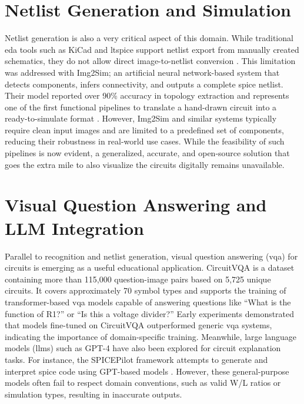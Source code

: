 \section{Netlist Generation and Simulation}

Netlist generation is also a very critical aspect of this domain. While traditional \gls{eda} tools such as KiCad and \gls{ltspice} support netlist export from manually created schematics, they do not allow direct image-to-netlist conversion \cite{kicad2024spice}. This limitation was addressed with Img2Sim; an artificial neural network-based system that detects components, infers connectivity, and outputs a complete \gls{spice} netlist. Their model reported over 90\% accuracy in topology extraction and represents one of the first functional pipelines to translate a hand-drawn circuit into a ready-to-simulate format \cite{sertdemir2022img2sim}. However, Img2Sim and similar systems typically require clean input images and are limited to a predefined set of components, reducing their robustness in real-world use cases. While the feasibility of such pipelines is now evident, a generalized, accurate, and open-source solution that goes the extra mile to also visualize the circuits digitally remains unavailable.

\section{Visual Question Answering and LLM Integration}

Parallel to recognition and netlist generation, visual question answering (\gls{vqa}) for circuits is emerging as a useful educational application. CircuitVQA is a dataset containing more than 115,000 question-image pairs based on 5,725 unique circuits. It covers approximately 70 symbol types and supports the training of transformer-based \gls{vqa} models capable of answering questions like ``What is the function of R1?'' or ``Is this a voltage divider?'' Early experiments demonstrated that models fine-tuned on CircuitVQA outperformed generic \gls{vqa} systems, indicating the importance of domain-specific training. Meanwhile, large language models (\glspl{llm}) such as GPT-4 have also been explored for circuit explanation tasks. For instance, the SPICEPilot framework attempts to generate and interpret \gls{spice} code using GPT-based models \cite{vungarala2024spicepilot}. However, these general-purpose models often fail to respect domain conventions, such as valid W/L ratios or simulation types, resulting in inaccurate outputs.

